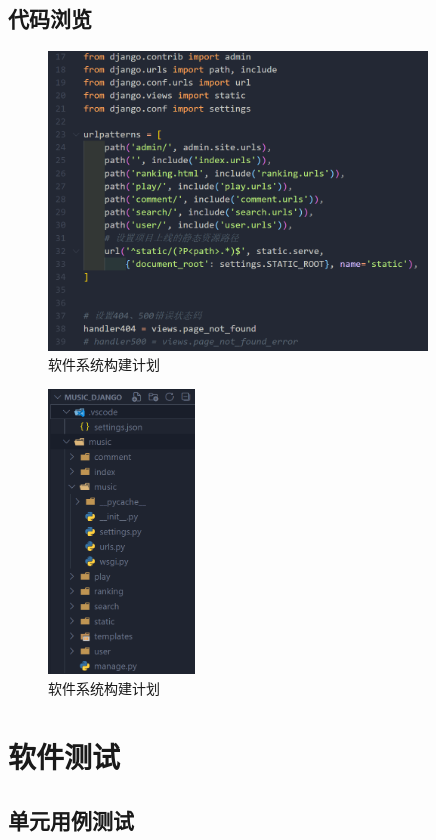 \documentclass[UTF8,14pt]{article}
\numberwithin{figure}{subsubsection}
\numberwithin{table}{subsubsection}
\begin{document}
\subsection{代码浏览}
\begin{minipage}[t]{0.7\linewidth}
	\begin{figure}[H]
		\includegraphics[width=10.06cm,height=7.92cm]{index.png}
		\caption{软件系统构建计划}
	\end{figure}
\end{minipage}
\hfill
\begin{minipage}[t]{0.28\linewidth}
	\begin{figure}[H]
		\centering
		\includegraphics[width=3.90cm,height=7.55cm]{3.png}
		\caption{软件系统构建计划}
	\end{figure}
\end{minipage}

\section{软件测试}
\subsection{单元用例测试}
\end{document}
